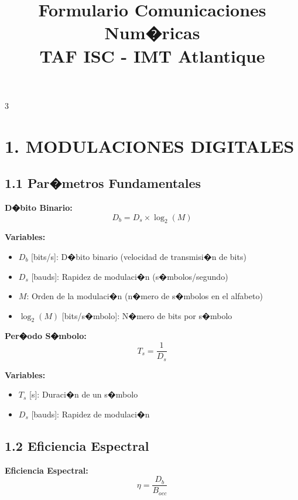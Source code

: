 ﻿\documentclass[8pt,a4paper]{article}
\title{\textbf{\Large Formulario Comunicaciones Num�ricas\\\normalsize TAF ISC - IMT Atlantique}}
\author{}
\date{}
\begin{document}
\maketitle

\begin{multicols}{3}
\footnotesize

\section*{\color{sectioncolor}\normalsize 1. MODULACIONES DIGITALES}
\vspace{-3mm}

\subsection*{\small 1.1 Par�metros Fundamentales}
\vspace{-2mm}

\textbf{D�bito Binario:}
\[
D_b = D_s \times \log_2(M)
\]

\textbf{Variables:}
\begin{itemize}[leftmargin=*,itemsep=0pt]
    \item $D_b$ [bits/s]: D�bito binario (velocidad de transmisi�n de bits)
    \item $D_s$ [bauds]: Rapidez de modulaci�n (s�mbolos/segundo)
    \item $M$: Orden de la modulaci�n (n�mero de s�mbolos en el alfabeto)
    \item $\log_2(M)$ [bits/s�mbolo]: N�mero de bits por s�mbolo
\end{itemize}

\textbf{Per�odo S�mbolo:}
\[
T_s = \frac{1}{D_s}
\]

\textbf{Variables:}
\begin{itemize}[leftmargin=*,itemsep=0pt]
    \item $T_s$ [s]: Duraci�n de un s�mbolo
    \item $D_s$ [bauds]: Rapidez de modulaci�n
\end{itemize}

\vspace{-2mm}
\subsection*{\small 1.2 Eficiencia Espectral}
\vspace{-2mm}

\textbf{Eficiencia Espectral:}
\[
\eta = \frac{D_b}{B_{occ}}
\]


\end{multicols}
\end{document}
